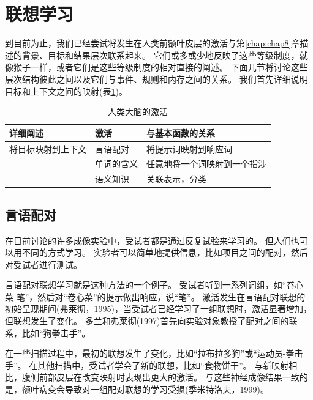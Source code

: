 \section{联想学习}
\par

到目前为止，我们已经尝试将发生在人类前额叶皮层的激活与第\ref{chap:chap8}章描述的背景、目标和结果层次联系起来。
它们或多或少地反映了这些等级制度，就像猴子一样，或者它们是这些等级制度的相对直接的阐述。
下面几节将讨论这些层次结构彼此之间以及它们与事件、规则和内存之间的关系。
我们首先详细说明目标和上下文之间的映射(表\ref{tab:9_6})。


\begin{table}[htbp] 
	\newcommand{\tabincell}[2]{\begin{tabular}{@{}#1@{}}#2\end{tabular}} %
	\centering
	\caption{人类大脑的激活\label{tab:9_6}}
	\renewcommand\arraystretch{1.5}	%
	\begin{tabular}{lll}
		\toprule
		详细阐述 & 激活 & 与基本函数的关系\\
		\midrule
		将目标映射到上下文 & 言语配对 & 将提示词映射到响应词  \\
		& 单词的含义 & 任意地将一个词映射到一个指涉 \\
		& 语义知识 & 关联表示，分类 \\
		\bottomrule
		
	\end{tabular}%
\end{table}%



\subsection{言语配对}
\par
在目前讨论的许多成像实验中，受试者都是通过反复试验来学习的。
但人们也可以用不同的方式学习。
实验者可以简单地提供信息，比如项目之间的配对，然后对受试者进行测试。
\par


言语配对联想学习就是这种方法的一个例子。
受试者听到一系列词组，如“卷心菜-笔”，然后对“卷心菜”的提示做出响应，说“笔”。
激活发生在言语配对联想的初始呈现期间(弗莱彻，1995)，当受试者已经学习了一组联想时，激活显著增加，但联想发生了变化。
多兰和弗莱彻(1997)首先向实验对象教授了配对之间的联系，比如“狗拳击手”。
\par


在一些扫描过程中，最初的联想发生了变化，比如“拉布拉多狗”或“运动员-拳击手”。
在其他扫描中，受试者学会了新的联想，比如“食物饼干”。
与新映射相比，腹侧前部皮层在改变映射时表现出更大的激活。
与这些神经成像结果一致的是，额叶病变会导致对一组配对联想的学习受损(季米特洛夫，1999)。
\par


